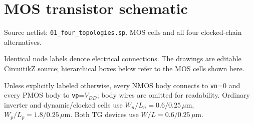 \clearpage\section{MOS transistor schematic}
\begingroup\small
Source netlist: \texttt{01\_four\_topologies.sp}. MOS cells and all four clocked-chain alternatives.

Identical node labels denote electrical connections. The drawings are editable CircuitikZ source; hierarchical boxes below refer to the MOS cells shown here.

Unless explicitly labeled otherwise, every NMOS body connects to \texttt{vn}=0 and every PMOS body to \texttt{vp}=\(V_{DD}\); body wires are omitted for readability. Ordinary inverter and dynamic/clocked cells use \(W_n/L_n=0.6/0.25\,\mu\mathrm m\), \(W_p/L_p=1.8/0.25\,\mu\mathrm m\). Both TG devices use \(W/L=0.6/0.25\,\mu\mathrm m\). 

